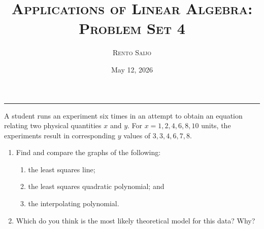 \documentclass[10pt]{extarticle}
\title{\centering\Large\textsc{Applications of Linear Algebra: Problem Set 4}}
\author{\large \textsc{Rento Saijo}}
\date{May 12, 2026}
\begin{document}
\maketitle
\thispagestyle{fancy}
\vspace{-1em}\noindent\rule{\linewidth}{0.6pt}\vspace{0.5em}

\begin{problem}[Problem 1]
A student runs an experiment six times in an attempt to obtain an equation relating two physical quantities $x$ and $y$. For $x=1,2,4,6,8,10$ units, the experiments result in corresponding $y$ values of $3,3,4,6,7,8$.
\begin{enumerate}[label=(\alph*)]
\item Find and compare the graphs of the following:
\begin{enumerate}[label=(\roman*)]
\item the least squares line;
\item the least squares quadratic polynomial; and
\item the interpolating polynomial.
\end{enumerate}
\item Which do you think is the most likely theoretical model for this data? Why?
\end{enumerate}
\end{problem}
\end{document}
